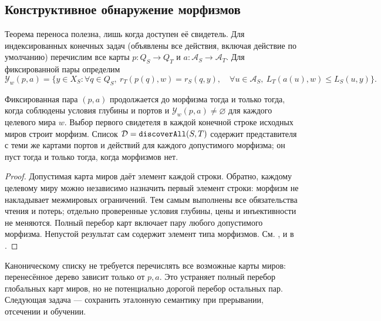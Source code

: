 \subsection{Конструктивное обнаружение морфизмов}
Теорема переноса полезна, лишь когда доступен её свидетель. Для индексированных конечных задач (объявлены все действия, включая действие по умолчанию) перечислим все карты $p:Q_S\to Q_T$ и $a:\mathcal A_S\to\mathcal A_T$. Для фиксированной пары определим
\[
 \mathcal Y_w(p,a)=\{y\in X_S: \forall q\in Q_S,\ r_T(p(q),w)=r_S(q,y),\quad
 \forall u\in\mathcal A_S,\ L_T(a(u),w)\le L_S(u,y)\}.
\]
\begin{theorem}\label{thm:discovery}
Фиксированная пара $(p,a)$ продолжается до морфизма тогда и только тогда, когда соблюдены условия глубины и портов и $\mathcal Y_w(p,a)\ne\varnothing$ для каждого целевого мира $w$. Выбор первого свидетеля в каждой конечной строке исходных миров строит морфизм. Список $\mathcal D=\allowbreak\texttt{discoverAll}\allowbreak(S,T)$ содержит представителя с теми же картами портов и действий для каждого допустимого морфизма; он пуст тогда и только тогда, когда морфизмов нет.
\end{theorem}
\begin{proof}
Допустимая карта миров даёт элемент каждой строки. Обратно, каждому целевому миру можно независимо назначить первый элемент строки: морфизм не накладывает межмировых ограничений. Тем самым выполнены все обязательства чтения и потерь; отдельно проверенные условия глубины, цены и инъективности не меняются. Полный перебор карт включает пару любого допустимого морфизма. Непустой результат сам содержит элемент типа морфизмов. См. ,  и  в .
\end{proof}
Каноническому списку не требуется перечислять все возможные карты миров: перенесённое дерево зависит только от $p,a$. Это устраняет полный перебор глобальных карт миров, но не потенциально дорогой перебор остальных пар. Следующая задача --- сохранить эталонную семантику при прерывании, отсечении и обучении.
